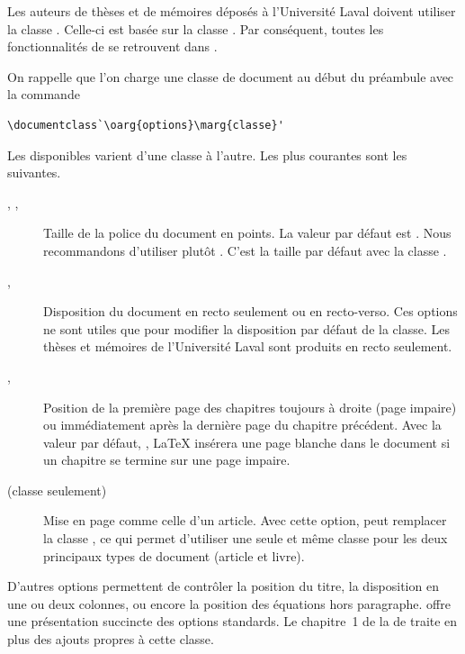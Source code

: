 Les auteurs de thèses et de mémoires déposés à l'Université Laval
doivent utiliser la classe  \citep{ulthese}. Celle-ci
est basée sur la classe . Par conséquent, toutes les
fonctionnalités de  se retrouvent dans .

On rappelle que l'on charge une classe de document au début du
préambule avec la commande
\begin{lstlisting}
\documentclass`\oarg{options}\marg{classe}'
\end{lstlisting}
Les  disponibles varient d'une classe à l'autre. Les
plus courantes sont les suivantes.
\begin{description}
\item[\mdseries \code{10pt}, \code{11pt}, \code{12pt}] Taille de la
  police du document en points. La valeur par défaut est \code{10pt}.
  Nous recommandons d'utiliser plutôt \code{11pt}. C'est la taille par
  défaut avec la classe .
\item[\mdseries {}, ] Disposition du
  document en recto seulement ou en recto-verso. Ces options ne sont
  utiles que pour modifier la disposition par défaut de la classe. Les
  thèses et mémoires de l'Université Laval sont produits en recto
  seulement.
\item[\mdseries {}, ] Position de la
  première page des chapitres toujours à droite (page impaire) ou
  immédiatement après la dernière page du chapitre précédent. Avec la
  valeur par défaut, , {\LaTeX} insérera une page
  blanche dans le document si un chapitre se termine sur une page
  impaire.
\item[\mdseries {} (classe  seulement)] Mise
  en page comme celle d'un article. Avec cette option, 
  peut remplacer la classe , ce qui permet d'utiliser
  une seule et même classe pour les deux principaux types de document
  (article et livre).
\end{description}

D'autres options permettent de contrôler la position du titre, la
disposition en une ou deux colonnes, ou encore la position des
équations hors paragraphe. \citet{Thurnherr:class-options} offre une
présentation succincte des options standards. Le chapitre~1 de la %
de  traite en plus des ajouts propres à cette classe.



